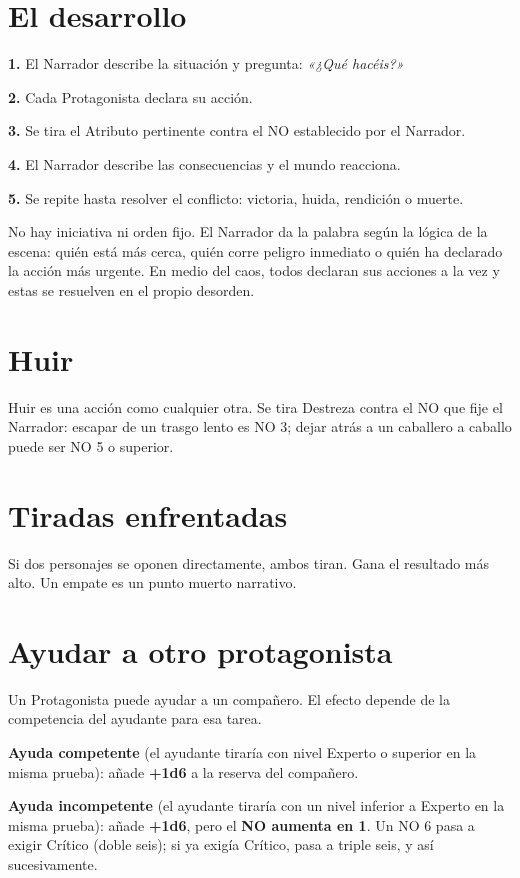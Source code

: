 \documentclass[10pt,a4paper]{article}
\begin{document}
\section*{El desarrollo}
\textbf{1.} El Narrador describe la situación y pregunta: \textit{«¿Qué hacéis?»}

\textbf{2.} Cada Protagonista declara su acción.

\textbf{3.} Se tira el Atributo pertinente contra el NO establecido por el Narrador.

\textbf{4.} El Narrador describe las consecuencias y el mundo reacciona.

\textbf{5.} Se repite hasta resolver el conflicto: victoria, huida, rendición o muerte.

No hay iniciativa ni orden fijo. El Narrador da la palabra según la lógica de la escena: quién está más cerca, quién corre peligro inmediato o quién ha declarado la acción más urgente. En medio del caos, todos declaran sus acciones a la vez y estas se resuelven en el propio desorden.

\section*{Huir}
Huir es una acción como cualquier otra. Se tira Destreza contra el NO que fije el Narrador: escapar de un trasgo lento es NO 3; dejar atrás a un caballero a caballo puede ser NO 5 o superior.

\section*{Tiradas enfrentadas}
Si dos personajes se oponen directamente, ambos tiran. Gana el resultado más alto. Un empate es un punto muerto narrativo.

\section*{Ayudar a otro protagonista}
Un Protagonista puede ayudar a un compañero. El efecto depende de la competencia del ayudante para esa tarea.

\textbf{Ayuda competente} (el ayudante tiraría con nivel Experto o superior en la misma prueba): añade \textbf{+1d6} a la reserva del compañero.

\textbf{Ayuda incompetente} (el ayudante tiraría con un nivel inferior a Experto en la misma prueba): añade \textbf{+1d6}, pero el \textbf{NO aumenta en 1}. Un NO 6 pasa a exigir Crítico (doble seis); si ya exigía Crítico, pasa a triple seis, y así sucesivamente.
\end{document}
